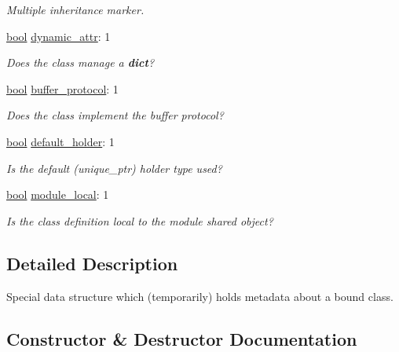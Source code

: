 \begin{DoxyCompactItemize}
\begin{DoxyCompactList}\small\item\em Multiple inheritance marker. \end{DoxyCompactList}\item 
\mbox{\hyperlink{asdl_8h_af6a258d8f3ee5206d682d799316314b1}{bool}} \mbox{\hyperlink{structtype__record_af7b44bfceaec849cd9832043600b247b}{dynamic\+\_\+attr}}\+: 1
\begin{DoxyCompactList}\small\item\em Does the class manage a {\bfseries{dict}}? \end{DoxyCompactList}\item 
\mbox{\hyperlink{asdl_8h_af6a258d8f3ee5206d682d799316314b1}{bool}} \mbox{\hyperlink{structtype__record_ab5910eea61616c06a02acc36efc21a57}{buffer\+\_\+protocol}}\+: 1
\begin{DoxyCompactList}\small\item\em Does the class implement the buffer protocol? \end{DoxyCompactList}\item 
\mbox{\hyperlink{asdl_8h_af6a258d8f3ee5206d682d799316314b1}{bool}} \mbox{\hyperlink{structtype__record_a22be67a2d89db4dcf7ea338dc435f5e3}{default\+\_\+holder}}\+: 1
\begin{DoxyCompactList}\small\item\em Is the default (unique\+\_\+ptr) holder type used? \end{DoxyCompactList}\item 
\mbox{\hyperlink{asdl_8h_af6a258d8f3ee5206d682d799316314b1}{bool}} \mbox{\hyperlink{structtype__record_a6a5eaf1332f8278dc0f41643fd6783a7}{module\+\_\+local}}\+: 1
\begin{DoxyCompactList}\small\item\em Is the class definition local to the module shared object? \end{DoxyCompactList}\end{DoxyCompactItemize}


\subsection{Detailed Description}
Special data structure which (temporarily) holds metadata about a bound class. 

\subsection{Constructor \& Destructor Documentation}
\mbox{\label{structtype__record_a2d1135673b56a24b7dd88670cd452c8b}} 
